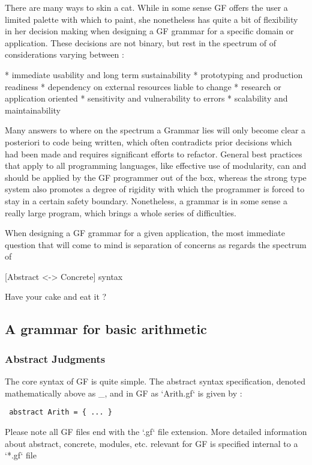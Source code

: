 \documentclass[11pt, a4paper]{article}
\begin{document}
There are many ways to skin a cat. While in some sense GF offers the user a
limited palette with which to paint, she nonetheless has quite a bit of
flexibility in her decision making when designing a GF grammar for a specific
domain or application. These decisions are not binary, but rest in the spectrum
of of considerations varying between :

* immediate usability and long term sustainability * prototyping and production
readiness * dependency on external resources liable to change * research or
application oriented * sensitivity and vulnerability to errors * scalability and
maintainability

Many answers to where on the spectrum a Grammar lies will only become clear a
posteriori to code being written, which often contradicts prior decisions which
had been made and requires significant efforts to refactor. General best
practices that apply to all programming languages, like effective use of
modularity, can and should be applied by the GF programmer out of the box,
whereas the strong type system also promotes a degree of rigidity with which the
programmer is forced to stay in a certain safety boundary. Nonetheless, a
grammar is in some sense a really large program, which brings a whole series of
difficulties.

When designing a GF grammar for a given application, the most immediate question
that will come to mind is separation of concerns as regards the spectrum of

[Abstract <-> Concrete] syntax

Have your cake and eat it ?

\subsection{A grammar for basic arithmetic}

\subsubsection {Abstract Judgments}

The core syntax of GF is quite simple. The abstract syntax specification,
denoted mathematically above as _, and in GF as `Arith.gf` is given by :


\begin{verbatim} abstract Arith = { ... }
\end{verbatim}

Please note all GF files end with the `.gf` file extension. More detailed
information about abstract, concrete, modules, etc. relevant for GF is specified
internal to a `*.gf` file
\end{document}
